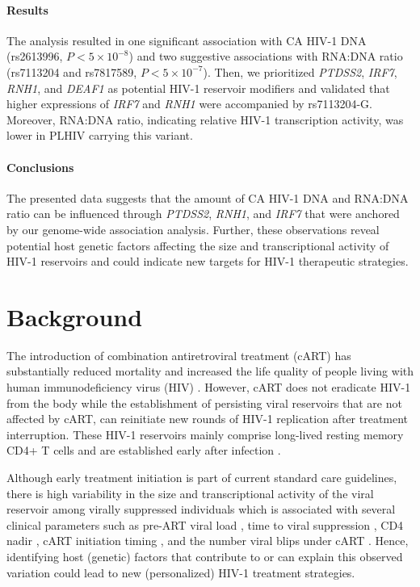 \documentclass{book}
\begin{document}
\begin{refsection}
\paragraph*{Results}
The analysis resulted in one significant association with CA HIV-1 DNA (rs2613996, $P < 5 \times 10^{-8}$) and two suggestive associations with RNA:DNA ratio (rs7113204 and rs7817589, $P < 5 \times 10^{-7}$).
Then, we prioritized \textit{PTDSS2}, \textit{IRF7}, \textit{RNH1}, and \textit{DEAF1} as potential HIV-1 reservoir modifiers and validated that higher expressions of \textit{IRF7} and \textit{RNH1} were accompanied by rs7113204-G.
Moreover, RNA:DNA ratio, indicating relative HIV-1 transcription activity, was lower in PLHIV carrying this variant.

\paragraph*{Conclusions}
The presented data suggests that the amount of CA HIV-1 DNA and RNA:DNA ratio can be influenced through \textit{PTDSS2}, \textit{RNH1}, and \textit{IRF7} that were anchored by our genome-wide association analysis.
Further, these observations reveal potential host genetic factors affecting the size and transcriptional activity of HIV-1 reservoirs and could indicate new targets for HIV-1 therapeutic strategies.

\clearpage
\newpage
\section*{Background}
The introduction of combination antiretroviral treatment (cART) has substantially reduced mortality and increased the life quality of people living with human immunodeficiency virus (HIV) \cite{Palella1998Declining}.
However, cART does not eradicate HIV-1 from the body while the establishment of persisting viral reservoirs that are not affected by cART, can reinitiate new rounds of HIV-1 replication after treatment interruption.
These HIV-1 reservoirs mainly comprise long-lived resting memory CD4+ T cells and are established early after infection \cite{Le2011Rebound}.

Although early treatment initiation is part of current standard care guidelines, there is high variability in the size and transcriptional activity of the viral reservoir among virally suppressed individuals which is associated with several clinical parameters such as pre-ART viral load \cite{Bachmann2019Determinants}, time to viral suppression \cite{Bachmann2019Determinants}, CD4 nadir \cite{Boulassel2012CD4}, cART initiation timing \cite{Ananworanich2015How,Buzon2014Long}, and the number viral blips under cART \cite{Bachmann2019Determinants,Chun2002Relationship}.
Hence, identifying host (genetic) factors that contribute to or can explain this observed variation could lead to new (personalized) HIV-1 treatment strategies.


\end{refsection}
\end{document}
